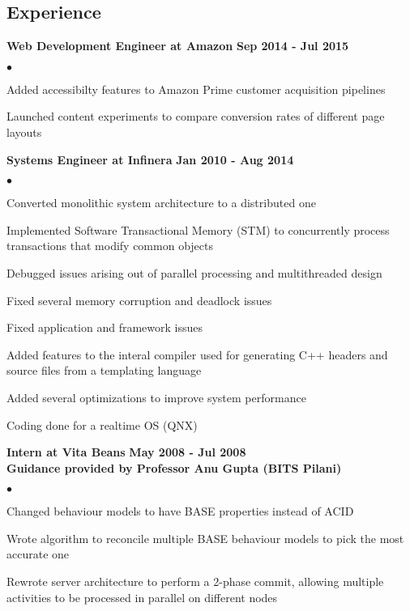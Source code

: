 \documentclass[margin,line]{res}
\newenvironment{list2}{
  \begin{list}{$\bullet$}{%
      \setlength{\itemsep}{0in}
      \setlength{\parsep}{0in} \setlength{\parskip}{0in}
      \setlength{\topsep}{0in} \setlength{\partopsep}{0in}
      \setlength{\leftmargin}{0.2in}}}{\end{list}}
\begin{document}
\begin{resume}
\section{\sc Experience}

{\bf Web Development Engineer at Amazon} \hfill {\bf Sep 2014 - Jul 2015}\\
\begin{list2}
\item Added accessibilty features to Amazon Prime customer acquisition pipelines
\item Launched content experiments to compare conversion rates of different page layouts
\end{list2}

{\bf Systems Engineer at Infinera} \hfill {\bf Jan 2010 - Aug 2014}\\
\begin{list2}
\item Converted monolithic system architecture to a distributed one
\item Implemented Software Transactional Memory (STM) to concurrently process transactions that modify common objects
\item Debugged issues arising out of parallel processing and multithreaded design
\item Fixed several memory corruption and deadlock issues
\item Fixed application and framework issues
\item Added features to the interal compiler used for generating C++ headers and source files from a templating language
\item Added several optimizations to improve system performance
\item Coding done for a realtime OS (QNX)
\end{list2}

{\bf Intern at Vita Beans} \hfill {\bf May 2008 - Jul 2008} \\
{\bf Guidance provided by Professor Anu Gupta (BITS Pilani)}
\vspace*{.05in}
\begin{list2}
\item Changed behaviour models to have BASE properties instead of ACID
\item Wrote algorithm to reconcile multiple BASE behaviour models to pick the most accurate one
\item Rewrote server architecture to perform a 2-phase commit, allowing multiple activities to be processed in parallel on different nodes
\end{list2}


\end{resume}
\end{document}
